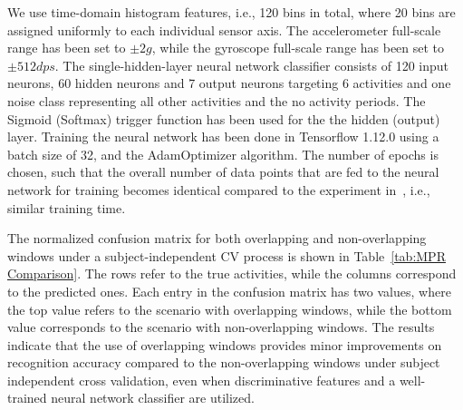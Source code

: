 We use time-domain histogram features, i.e., 120 bins in total, where 20 bins are assigned uniformly to each individual sensor axis. The accelerometer full-scale range has been set to $\pm{2g}$, while the gyroscope full-scale range has been set to $\pm{512dps}$. The single-hidden-layer neural network classifier consists of 120 input neurons, 60 hidden neurons and 7 output neurons targeting 6 activities and one noise class representing all other activities and the no activity periods. The Sigmoid (Softmax) trigger function has been used for the the hidden (output) layer. Training the neural network has been done in Tensorflow 1.12.0 using a batch size of 32, and the AdamOptimizer algorithm. The number of epochs is chosen, such that the overall number of data points that are fed to the neural network for training becomes identical compared to the experiment in~\cite{omid2019MPR}, i.e., similar training time. 

The normalized confusion matrix for both overlapping and non-overlapping windows under a subject-independent CV process is shown in Table~\ref{tab:MPR Comparison}. The rows refer to the true activities, while the columns correspond to the predicted ones. Each entry in the confusion matrix has two values, where the top value refers to the scenario with overlapping windows, while the bottom value corresponds to the scenario with non-overlapping windows. The results indicate that the use of overlapping windows provides minor improvements on recognition accuracy compared to the non-overlapping windows under subject independent cross validation, even when discriminative features and a well-trained neural network classifier are utilized.

